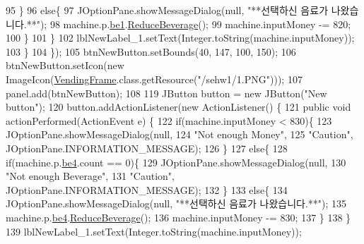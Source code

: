 \begin{DoxyCode}
95                     \}
96                     \textcolor{keywordflow}{else}\{
97                         JOptionPane.showMessageDialog(null, \textcolor{stringliteral}{"**선택하신 음료가 나왔습니다.**"});
98                         machine.p.\hyperlink{classsehw1_1_1product_a78de5ce35a2661747de59366b041bf28}{be1}.\hyperlink{classsehw1_1_1beverage_ad2c40378698fb6c31c8f02bddb2a4e29}{ReduceBeverage}();
99                         machine.inputMoney -= 820;
100                     \}
101                 \}   
102                 lblNewLabel\_1.setText(Integer.toString(machine.inputMoney));
103             \}
104         \});
105         btnNewButton.setBounds(40, 147, 100, 150);
106         btnNewButton.setIcon(\textcolor{keyword}{new} ImageIcon(\hyperlink{classsehw1_1_1_vending_frame_a82f3d8fe653c04d594b0a46e751328a0}{VendingFrame}.class.getResource(\textcolor{stringliteral}{"/sehw1/1.PNG"})));
107         panel.add(btnNewButton);
108         
119         JButton button = \textcolor{keyword}{new} JButton(\textcolor{stringliteral}{"New button"});
120         button.addActionListener(\textcolor{keyword}{new} ActionListener() \{
121             \textcolor{keyword}{public} \textcolor{keywordtype}{void} actionPerformed(ActionEvent e) \{
122                 \textcolor{keywordflow}{if}(machine.inputMoney < 830)\{
123                     JOptionPane.showMessageDialog(null,
124                             \textcolor{stringliteral}{"Not enough Money"}, 
125                             \textcolor{stringliteral}{"Caution"}, JOptionPane.INFORMATION\_MESSAGE);
126                 \}
127                 \textcolor{keywordflow}{else}\{
128                     \textcolor{keywordflow}{if}(machine.p.\hyperlink{classsehw1_1_1product_acfca06ee7a734ee15073262cb8fa1c24}{be4}.count == 0)\{
129                         JOptionPane.showMessageDialog(null,
130                                 \textcolor{stringliteral}{"Not enough Beverage"}, 
131                                 \textcolor{stringliteral}{"Caution"}, JOptionPane.INFORMATION\_MESSAGE);
132                     \}
133                     \textcolor{keywordflow}{else}\{
134                         JOptionPane.showMessageDialog(null, \textcolor{stringliteral}{"**선택하신 음료가 나왔습니다.**"});
135                         machine.p.\hyperlink{classsehw1_1_1product_acfca06ee7a734ee15073262cb8fa1c24}{be4}.\hyperlink{classsehw1_1_1beverage_ad2c40378698fb6c31c8f02bddb2a4e29}{ReduceBeverage}();
136                         machine.inputMoney -= 830;
137                     \}
138                 \}
139                 lblNewLabel\_1.setText(Integer.toString(machine.inputMoney));

\end{DoxyCode}
